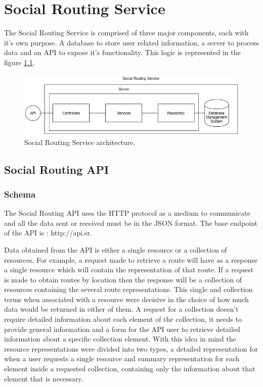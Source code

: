\chapter{Social Routing Service}

The Social Routing Service is comprised of three major components, each with it's own purpose. 
A database to store user related information, a server to process data and an API to expose it's functionality.
This logic is represented in the figure \ref{fig:socialroutingservice}.

\begin{figure}[ht]            
    \includegraphics[width=\textwidth]{images/project-structure/service-structure.PNG}
    \caption{Social Routing Service architecture.}
    \label{fig:socialroutingservice}
\end{figure}  

\section*{Social Routing API}

    \subsection*{Schema}
        The Social Routing API uses the HTTP protocol as a medium to 
        communicate and all the data sent or received must be in the JSON \cite{jsonwebsite} format.
        The base endpoint of the API is : http://api.sr.\par
        Data obtained from the API is either a single resource or a collection of resources. For example, a request
        made to retrieve a route will have as a response a single resource which will contain the representation of that
        route. If a request is made to obtain routes by location then the response will be a collection of resources containing
        the several route representations. This single and collection terms when associated with a
        resource were decisive in the choice of how much data would be returned in either of them. A request for a collection
        doesn't require detailed information about each element of the collection, it needs to provide general information and
        a form for the API user to retrieve detailed information about a specific collection element.
        With this idea in mind the resource representations were divided into two types, a detailed representation for when a user
        requests a single resource and summary representation for each element inside a requested collection, containing only the 
        information about that element that is necessary.

